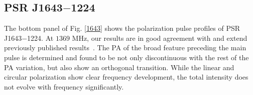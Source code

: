 \documentclass[useAMS,usenatbib]{mn2e}
\begin{document}
%
%
%


\subsection{PSR J1643$-$1224}

The bottom panel of Fig. \ref{1643} shows the polarization pulse profiles of 
PSR J1643$-$1224.
%
At $1369$ MHz, our results are in good agreement with and extend previously published
results~\citep{Ord04,Yan11}.
%
The PA of the broad feature preceding the main pulse is determined and 
found to be not only discontinuous with the rest of the PA variation, but 
also show an orthogonal transition.
%
While the linear and circular polarization show clear frequency development,
the total intensity does not evolve with frequency significantly.
\end{document}

